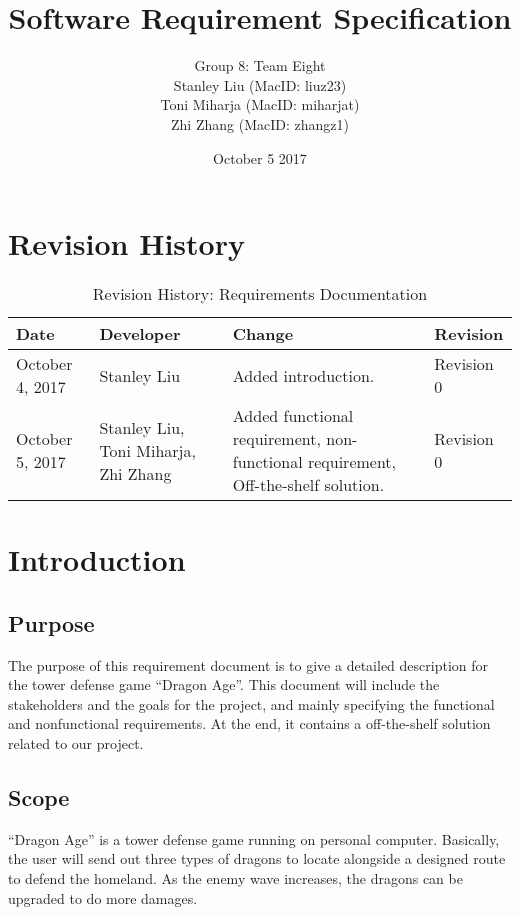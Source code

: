 \documentclass{article}
\title{Software Requirement Specification}
\author{Group 8: Team Eight \\
                 Stanley Liu (MacID: liuz23) \\    
                 Toni Miharja (MacID: miharjat)\\
                 Zhi Zhang (MacID: zhangz1)}
\date{October 5 2017 }
\begin{document}
\maketitle
\newpage
\tableofcontents
\newpage
 
\section{Revision History}
\begin{table}[h!]
    \centering
    \begin{tabular}{|p{2.5cm}|p{3cm}|p{3cm}|p{2cm}|}
    \hline
    \textbf {Date}  & {Developer} & {Change} & {Revision} \\
    \hline
    October 4, 2017 & Stanley Liu & Added introduction. & Revision 0\\
    \hline
    October 5, 2017  & Stanley Liu, Toni Miharja, Zhi Zhang & Added functional requirement, non-functional requirement, Off-the-shelf solution. & Revision 0\\
    \hline
    \end{tabular}
    \caption{Revision History: Requirements Documentation}
\end{table}
 
\section{Introduction}

\subsection{Purpose}
The purpose of this requirement document is to give a detailed description for the tower defense game “Dragon Age”. This document will include the stakeholders and the goals for the project, and mainly specifying the functional and nonfunctional requirements. At the end, it contains a off-the-shelf solution related to our project.

\subsection{Scope}
“Dragon Age” is a tower defense game running on personal computer. Basically, the user will send out three types of dragons to locate alongside a designed route to defend the homeland. As the enemy wave increases, the dragons can be upgraded to do more damages.
\end{document}
